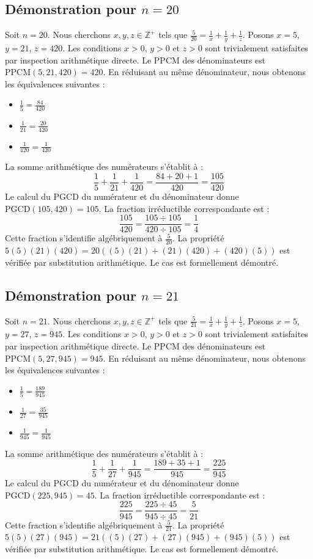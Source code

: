 \documentclass[12pt,a4paper]{article}
\begin{document}
\subsection{Démonstration pour $n = 20$}
Soit $n = 20$. Nous cherchons $x, y, z \in \mathbb{Z}^{+}$ tels que $\frac{5}{20} = \frac{1}{x} + \frac{1}{y} + \frac{1}{z}$.
Posons $x = 5$, $y = 21$, $z = 420$.
Les conditions $x > 0$, $y > 0$ et $z > 0$ sont trivialement satisfaites par inspection arithmétique directe.
Le PPCM des dénominateurs est $\text{PPCM}(5, 21, 420) = 420$.
En réduisant au même dénominateur, nous obtenons les équivalences suivantes :
\begin{itemize}
    \item $\frac{1}{5} = \frac{84}{420}$
    \item $\frac{1}{21} = \frac{20}{420}$
    \item $\frac{1}{420} = \frac{1}{420}$
\end{itemize}
La somme arithmétique des numérateurs s'établit à :
$$ \frac{1}{5} + \frac{1}{21} + \frac{1}{420} = \frac{84 + 20 + 1}{420} = \frac{105}{420} $$
Le calcul du PGCD du numérateur et du dénominateur donne $\text{PGCD}(105, 420) = 105$.
La fraction irréductible correspondante est :
$$ \frac{105}{420} = \frac{105 \div 105}{420 \div 105} = \frac{1}{4} $$
Cette fraction s'identifie algébriquement à $\frac{5}{20}$.
La propriété $5(5)(21)(420) = 20((5)(21) + (21)(420) + (420)(5))$ est vérifiée par substitution arithmétique.
Le cas est formellement démontré.

\subsection{Démonstration pour $n = 21$}
Soit $n = 21$. Nous cherchons $x, y, z \in \mathbb{Z}^{+}$ tels que $\frac{5}{21} = \frac{1}{x} + \frac{1}{y} + \frac{1}{z}$.
Posons $x = 5$, $y = 27$, $z = 945$.
Les conditions $x > 0$, $y > 0$ et $z > 0$ sont trivialement satisfaites par inspection arithmétique directe.
Le PPCM des dénominateurs est $\text{PPCM}(5, 27, 945) = 945$.
En réduisant au même dénominateur, nous obtenons les équivalences suivantes :
\begin{itemize}
    \item $\frac{1}{5} = \frac{189}{945}$
    \item $\frac{1}{27} = \frac{35}{945}$
    \item $\frac{1}{945} = \frac{1}{945}$
\end{itemize}
La somme arithmétique des numérateurs s'établit à :
$$ \frac{1}{5} + \frac{1}{27} + \frac{1}{945} = \frac{189 + 35 + 1}{945} = \frac{225}{945} $$
Le calcul du PGCD du numérateur et du dénominateur donne $\text{PGCD}(225, 945) = 45$.
La fraction irréductible correspondante est :
$$ \frac{225}{945} = \frac{225 \div 45}{945 \div 45} = \frac{5}{21} $$
Cette fraction s'identifie algébriquement à $\frac{5}{21}$.
La propriété $5(5)(27)(945) = 21((5)(27) + (27)(945) + (945)(5))$ est vérifiée par substitution arithmétique.
Le cas est formellement démontré.
\end{document}
